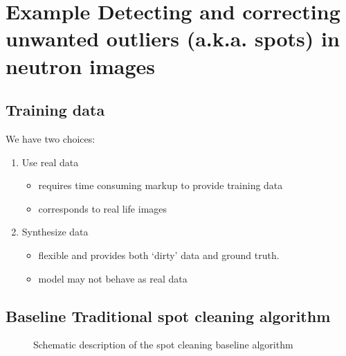 \documentclass[letterpaper,10pt,english]{sphinxmanual}
\begin{document}
\section{Example \sphinxhyphen{} Detecting and correcting unwanted outliers (a.k.a. spots) in neutron images}
\label{\detokenize{ML4NeutronImageSegmentation:example-detecting-and-correcting-unwanted-outliers-a-k-a-spots-in-neutron-images}}

\subsection{Training data}
\label{\detokenize{ML4NeutronImageSegmentation:training-data}}
We have two choices:
\begin{enumerate}
%
\item {} 
Use real data
\begin{itemize}
\item {} 
requires time consuming markup to provide training data

\item {} 
corresponds to real life images

\end{itemize}

\item {} 
Synthesize data
\begin{itemize}
\item {} 
flexible and provides both ‘dirty’ data and ground truth.

\item {} 
model may not behave as real data

\end{itemize}

\end{enumerate}


\subsection{Baseline \sphinxhyphen{} Traditional spot cleaning algorithm}
\label{\detokenize{ML4NeutronImageSegmentation:baseline-traditional-spot-cleaning-algorithm}}
\begin{figure}[htbp]
\centering
\capstart

\noindent{}
\caption{Schematic description of the spot cleaning baseline algorithm}\label{\detokenize{ML4NeutronImageSegmentation:id10}}\end{figure}
\end{document}
